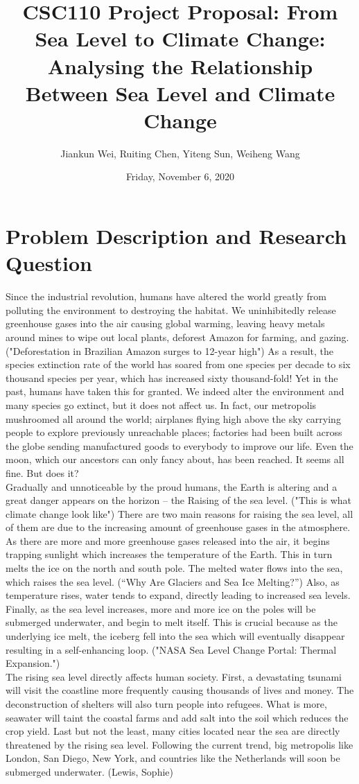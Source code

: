 \documentclass[fontsize=11pt]{article}
\title{CSC110 Project Proposal: From Sea Level to Climate Change: Analysing the Relationship Between Sea Level and Climate Change}
\author{Jiankun Wei, Ruiting Chen, Yiteng Sun, Weiheng Wang}
\date{Friday, November 6, 2020}
\begin{document}
    \maketitle

    \section*{Problem Description and Research Question}

    Since the industrial revolution, humans have altered the world greatly from polluting the environment to destroying the habitat. We uninhibitedly release greenhouse gases into the air causing global warming, leaving heavy metals around mines to wipe out local plants, deforest Amazon for farming, and gazing. ("Deforestation in Brazilian Amazon surges to 12-year high") As a result, the species extinction rate of the world has soared from one species per decade to six thousand species per year, which has increased sixty thousand-fold! Yet in the past, humans have taken this for granted. We indeed alter the environment and many species go extinct, but it does not affect us. In fact, our metropolis mushroomed all around the world; airplanes flying high above the sky carrying people to explore previously unreachable places; factories had been built across the globe sending manufactured goods to everybody to improve our life. Even the moon, which our ancestors can only fancy about, has been reached. It seems all fine. But does it?\\
    Gradually and unnoticeable by the proud humans, the Earth is altering and a great danger appears on the horizon -- the Raising of the sea level. ("This is what climate change look like") There are two main reasons for raising the sea level, all of them are due to the increasing amount of greenhouse gases in the atmosphere. As there are more and more greenhouse gases released into the air, it begins trapping sunlight which increases the temperature of the Earth. This in turn melts the ice on the north and south pole. The melted water flows into the sea, which raises the sea level. (“Why Are Glaciers and Sea Ice Melting?”) Also, as temperature rises, water tends to expand, directly leading to increased sea levels. Finally, as the sea level increases, more and more ice on the poles will be submerged underwater, and begin to melt itself. This is crucial because as the underlying ice melt, the iceberg fell into the sea which will eventually disappear resulting in a self-enhancing loop. ("NASA Sea Level Change Portal: Thermal Expansion.")\\
    The rising sea level directly affects human society. First, a devastating tsunami will visit the coastline more frequently causing thousands of lives and money. The deconstruction of shelters will also turn people into refugees. What is more, seawater will taint the coastal farms and add salt into the soil which reduces the crop yield. Last but not the least, many cities located near the sea are directly threatened by the rising sea level. Following the current trend, big metropolis like London, San Diego, New York, and countries like the Netherlands will soon be submerged underwater. (Lewis, Sophie)\\
\end{document}
